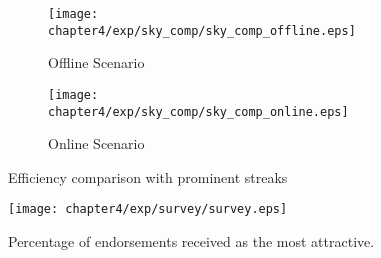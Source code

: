  



\begin{figure}[t]
\centering
    \begin{subfigure}[b]{0.45\textwidth}
        \texttt{[image: chapter4/exp/sky\_comp/sky\_comp\_offline.eps]}
        \caption{Offline Scenario}
    \end{subfigure}
    \begin{subfigure}[b]{0.45\textwidth}
        \texttt{[image: chapter4/exp/sky\_comp/sky\_comp\_online.eps]}
        \caption{Online Scenario}
    \end{subfigure}
\caption{Efficiency comparison with prominent streaks}
\label{exp:sky_comp}
\end{figure}

\begin{figure}[h]
\centering
\texttt{[image: chapter4/exp/survey/survey.eps]}
\caption{Percentage of endorsements received as the most attractive.}
\label{exp:survey}
\end{figure}


